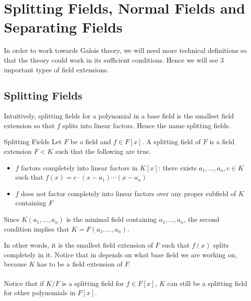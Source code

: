 \documentclass[a4paper]{article}
\begin{document}
\pagebreak
\section{Splitting Fields, Normal Fields and Separating Fields}
In order to work towards Galois theory, we will need more technical definitions so that the theory could work in its sufficient conditions. Hence we will see $3$ important types of field extensions. 

\subsection{Splitting Fields}
Intuitively, splitting fields for a polynomial in a base field is the smallest field extension so that $f$ splits into linear factors. Hence the name splitting fields. 

\begin{defn}{Splitting Fields}{} Let $F$ be a field and $f\in F[x]$. A splitting field of $F$ is a field extension $F<K$ such that the following are true. 
\begin{itemize}
\item $f$ factors completely into linear factors in $K[x]$: there exists $a_1,\dots,a_n,c\in K$ such that $f(x)=c\cdot (x-a_1)\cdots(x-a_n)$
\item $f$ does not factor completely into linear factors over any proper subfield of $K$ containing $F$
\end{itemize}
Since $K(a_1,\dots,a_n)$ is the minimal field containing $a_1,\dots,a_n$, the second condition implies that $K=F(a_1,\dots,a_n)$. 
\end{defn}

In other words, it is the smallest field extension of $F$ such that $f(x)$ splits completely in it. Notice that in depends on what base field we are working on, because $K$ has to be a field extension of $F$. \\~\\

Notice that if $K/F$ is a splitting field for $f\in F[x]$, $K$ can still be a splitting field for other polynomials in $F[x]$. 
\end{document}
